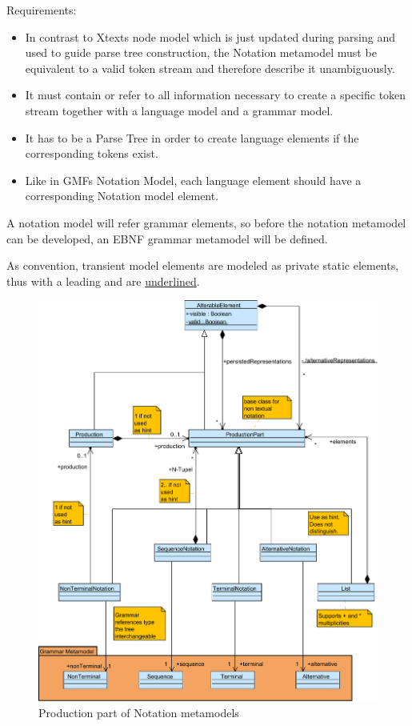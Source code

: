 Requirements:
\begin{itemize}
	\item In contrast to Xtexts node model which is just updated during parsing and used to guide parse tree construction, the Notation metamodel must be equivalent to a valid token stream and therefore describe it unambiguously. 
	\item It must contain or refer to all information necessary to create a specific token stream together with a language model and a grammar model.   
	\item It has to be a Parse Tree in order to create language elements if the corresponding tokens exist.
	\item Like in GMFs Notation Model, each language element should have a corresponding Notation model element.
\end{itemize}

A notation model will refer grammar elements, so before the notation metamodel can be developed, an EBNF grammar metamodel will be defined.

As convention, transient model elements are modeled as private static elements, thus with a leading \code{-} and are \underline{underlined}.

\begin{figure}
\centering
\includegraphics[scale=0.65]{gfx/ex/Notation_Prod} 
\caption{Production part of Notation metamodels}
\label{MM:Not:Prod}
\end{figure}

